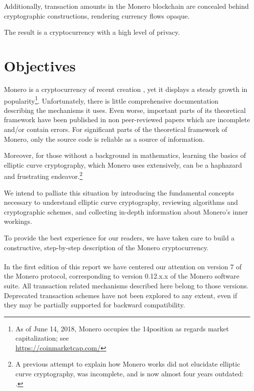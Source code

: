 Additionally, transaction amounts in the Monero blockchain are concealed behind cryptographic constructions, rendering currency flows opaque.

The result is a cryptocurrency with a high level of privacy.




\section{Objectives}
\label{sec:goals}

Monero is a cryptocurrency of recent creation \cite{bitmonero-launched, monero-history}, yet it displays a steady growth in popularity\footnote{\label{marketcap_note}As of June 14\nth, 2018, Monero occupies the 14\nth position as regards market capitalization; see\\ \url{https://coinmarketcap.com/}}. 
Unfortunately, there is little comprehensive documentation describing the mechanisms it uses. Even worse, important parts of its theoretical framework have been published in non peer-reviewed papers which are incomplete and/or contain errors. For significant parts of the theoretical framework of Monero, only the source code is reliable as a source of information.

Moreover, for those without a background in mathematics, learning the basics of elliptic curve cryptography, which Monero uses extensively, can be a haphazard and frustrating endeavor.\footnote{A previous attempt to explain how Monero works did not elucidate elliptic curve cryptography, was incomplete, and is now almost four years outdated: \cite{MRL-0003}.}

We intend to palliate this situation by introducing the fundamental concepts necessary to understand elliptic curve cryptography, reviewing algorithms and cryptographic schemes, and collecting in-depth information about Monero’s inner workings.

To provide the best experience for our readers, we have taken care to build a constructive, step-by-step description of the Monero cryptocurrency.
\\ 
\\ 

In the first edition of this report we have centered our attention on version 7 of the Monero protocol, corresponding to version 0.12.x.x of the Monero software suite. All transaction related mechanisms described here belong to those versions. Deprecated transaction schemes have not been explored to any extent, even if they may be partially supported for backward compatibility.


